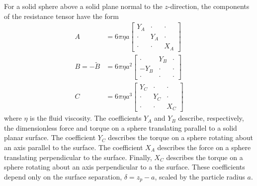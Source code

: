 For a solid sphere above a solid plane normal to the $z$-direction, the components of the resistance tensor have the form
\begin{align}
    A &=  6\pi \eta a \begin{bmatrix} 
        Y_A & \cdot & \cdot \\
        \cdot & Y_A & \cdot \\
        \cdot & \cdot & X_A  \end{bmatrix}
    \\
    B=-\tilde{B}&= 6\pi \eta a^2 \begin{bmatrix} 
        \cdot & Y_B & \cdot \\
        -Y_B & \cdot & \cdot \\
        \cdot & \cdot & \cdot  \end{bmatrix}
    \\
    C &= 6\pi \eta a^3 \begin{bmatrix} 
        Y_C & \cdot & \cdot \\
        \cdot & Y_C & \cdot \\
        \cdot & \cdot & X_C 
    \end{bmatrix} 
\end{align}
where $\eta$ is the fluid viscosity. The coefficients $Y_A$ and $Y_B$ describe, respectively, the dimensionless force and torque on a sphere translating parallel to a solid planar surface.\autocite{ONeill1964a} The coefficient $Y_C$ describes the torque on a sphere rotating about an axis parallel to the surface.\autocite{Dean1963} The coefficient $X_A$ describes the force on a sphere translating perpendicular to the surface.\autocite{Brenner1961a}  Finally, $X_C$ describes the torque on a sphere rotating about an axis perpendicular to a the surface.\autocite{Jeffrey1915} These coefficients depend only on the surface separation, $\delta=z_p-a$, scaled by the particle radius $a$.


